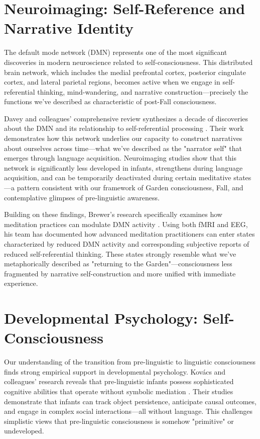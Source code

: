 \section{Neuroimaging: Self-Reference and Narrative Identity}

The default mode network (DMN) represents one of the most significant discoveries in modern neuroscience related to self-consciousness. This distributed brain network, which includes the medial prefrontal cortex, posterior cingulate cortex, and lateral parietal regions, becomes active when we engage in self-referential thinking, mind-wandering, and narrative construction—precisely the functions we've described as characteristic of post-Fall consciousness.

Davey and colleagues' comprehensive review synthesizes a decade of discoveries about the DMN and its relationship to self-referential processing \parencite{davey2024default}. Their work demonstrates how this network underlies our capacity to construct narratives about ourselves across time—what we've described as the "narrator self" that emerges through language acquisition. Neuroimaging studies show that this network is significantly less developed in infants, strengthens during language acquisition, and can be temporarily deactivated during certain meditative states—a pattern consistent with our framework of Garden consciousness, Fall, and contemplative glimpses of pre-linguistic awareness.

Building on these findings, Brewer's research specifically examines how meditation practices can modulate DMN activity \parencite{brewer2024meditation}. Using both fMRI and EEG, his team has documented how advanced meditation practitioners can enter states characterized by reduced DMN activity and corresponding subjective reports of reduced self-referential thinking. These states strongly resemble what we've metaphorically described as "returning to the Garden"—consciousness less fragmented by narrative self-construction and more unified with immediate experience.

\section{Developmental Psychology: Self-Consciousness}

Our understanding of the transition from pre-linguistic to linguistic consciousness finds strong empirical support in developmental psychology. Kovács and colleagues' research reveals that pre-linguistic infants possess sophisticated cognitive abilities that operate without symbolic mediation \parencite{kovacs2024prelinguistic}. Their studies demonstrate that infants can track object persistence, anticipate causal outcomes, and engage in complex social interactions—all without language. This challenges simplistic views that pre-linguistic consciousness is somehow "primitive" or undeveloped.

